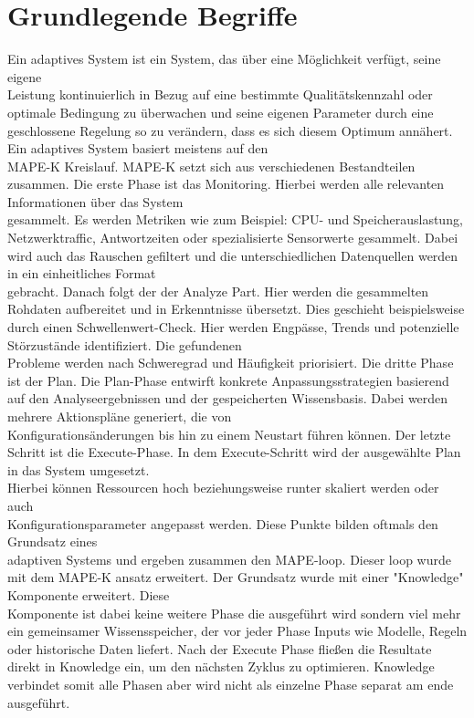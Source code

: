 \section{Grundlegende Begriffe}
\label{sec:bsp_depth}


Ein adaptives System ist ein System, das über eine Möglichkeit verfügt, seine eigene \\ Leistung kontinuierlich in Bezug auf eine bestimmte Qualitätskennzahl oder optimale Bedingung zu überwachen und seine eigenen Parameter durch eine geschlossene Regelung so zu verändern, dass es sich diesem Optimum annähert\cite{AdaptiveSysteme}. Ein adaptives System basiert meistens auf den \\ MAPE-K Kreislauf. MAPE-K setzt sich aus verschiedenen Bestandteilen zusammen. Die erste Phase ist das Monitoring. Hierbei werden alle relevanten Informationen über das System \\ gesammelt. Es werden Metriken wie zum Beispiel: CPU- und Speicherauslastung, \\ Netzwerktraffic, Antwortzeiten oder spezialisierte Sensorwerte gesammelt. Dabei wird auch das Rauschen gefiltert und die unterschiedlichen Datenquellen werden in ein einheitliches Format \\ gebracht. Danach folgt der der Analyze Part. Hier werden die gesammelten Rohdaten aufbereitet und in Erkenntnisse übersetzt. Dies geschieht beispielsweise durch einen Schwellenwert-Check. Hier werden Engpässe, Trends und potenzielle Störzustände identifiziert. Die gefundenen \\Probleme werden nach Schweregrad und Häufigkeit priorisiert. Die dritte Phase ist der Plan. Die Plan-Phase entwirft konkrete Anpassungsstrategien basierend auf den Analyseergebnissen und der gespeicherten Wissensbasis. Dabei werden mehrere Aktionspläne generiert, die von \\ Konfigurationsänderungen bis hin zu einem Neustart führen können. Der letzte Schritt ist die Execute-Phase. In dem Execute-Schritt wird der ausgewählte Plan in das System umgesetzt.\\ Hierbei können Ressourcen hoch beziehungsweise runter skaliert werden oder auch \\Konfigurationsparameter angepasst werden.
Diese Punkte bilden oftmals den Grundsatz eines \\ adaptiven Systems und ergeben zusammen den MAPE-loop. Dieser loop wurde mit dem MAPE-K ansatz erweitert. Der Grundsatz wurde mit einer "Knowledge" Komponente erweitert. Diese \\ Komponente ist dabei keine weitere Phase die ausgeführt wird sondern viel mehr ein gemeinsamer Wissensspeicher, der vor jeder Phase Inputs wie Modelle, Regeln oder historische Daten liefert. Nach der Execute Phase fließen die Resultate direkt in Knowledge ein, um den nächsten Zyklus zu optimieren. Knowledge verbindet somit alle Phasen aber wird nicht als einzelne Phase separat am ende ausgeführt\cite{MAPEK}. 
